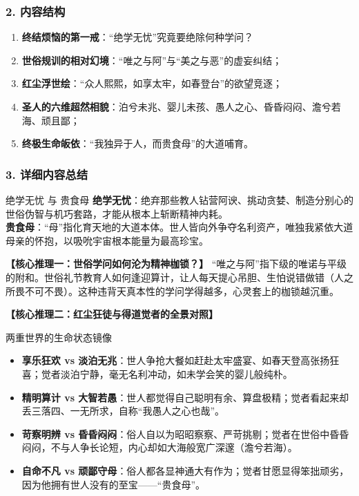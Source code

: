 \subsubsection{2. 内容结构}
\begin{enumerate}
    \item \textbf{终结烦恼的第一戒}：“绝学无忧”究竟要绝除何种学问？
    \item \textbf{世俗规训的相对幻境}：“唯之与阿”与“美之与恶”的虚妄纠结；
    \item \textbf{红尘浮世绘}：“众人熙熙，如享太牢，如春登台”的欲望竞逐；
    \item \textbf{圣人的六维超然相貌}：泊兮未兆、婴儿未孩、愚人之心、昏昏闷闷、澹兮若海、顽且鄙；
    \item \textbf{终极生命皈依}：“我独异于人，而贵食母”的大道哺育。
\end{enumerate}

\subsubsection{3. 详细内容总结}

\begin{ConceptBox}{绝学无忧 与 贵食母}
\textbf{绝学无忧}：绝弃那些教人钻营阿谀、挑动贪婪、制造分别心的世俗伪智与机巧套路，才能从根本上斩断精神内耗。\\
\textbf{贵食母}：“母”指化育天地的大道本体。世人皆向外争夺名利资产，唯独我紧依大道母亲的怀抱，以吸吮宇宙根本能量为最高珍宝。
\end{ConceptBox}

\noindent\textbf{【核心推理一：世俗学问如何沦为精神枷锁？】}
“唯之与阿”指下级的唯诺与平级的附和。世俗礼节教育人如何逢迎算计，让人每天提心吊胆、生怕说错做错（人之所畏不可不畏）。这种违背天真本性的学问学得越多，心灵套上的枷锁越沉重。

\noindent\textbf{【核心推理二：红尘狂徒与得道觉者的全景对照】}
\begin{DeductionBox}{两重世界的生命状态镜像}
\begin{itemize}
    \item \textbf{享乐狂欢 vs 淡泊无兆}：世人争抢大餐如赶赴太牢盛宴、如春天登高张扬狂喜；觉者淡泊宁静，毫无名利冲动，如未学会笑的婴儿般纯朴。
    \item \textbf{精明算计 vs 大智若愚}：世人都觉得自己聪明有余、算盘极精；觉者看起来却丢三落四、一无所求，自称“我愚人之心也哉”。
    \item \textbf{苛察明辨 vs 昏昏闷闷}：俗人自以为昭昭察察、严苛挑剔；觉者在世俗中昏昏闷闷，不与人争长论短，内心却如大海般宽广深邃（澹兮若海）。
    \item \textbf{自命不凡 vs 顽鄙守母}：俗人都各显神通大有作为；觉者甘愿显得笨拙顽劣，因为他拥有世人没有的至宝——“贵食母”。
\end{itemize}
\end{DeductionBox}

